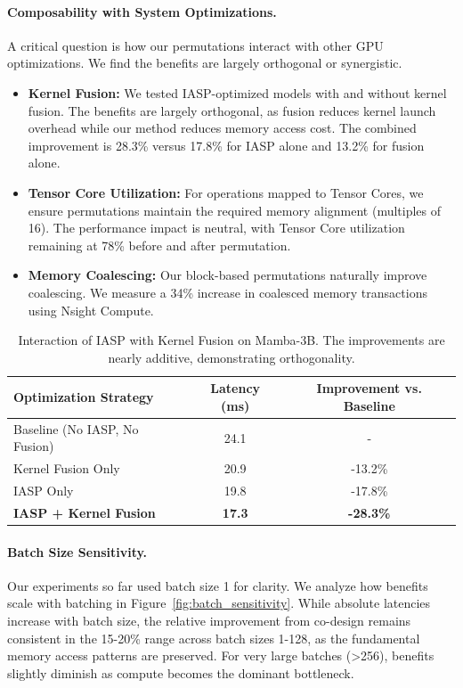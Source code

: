 \documentclass{article}
\begin{document}
\paragraph{Composability with System Optimizations.}
A critical question is how our permutations interact with other GPU optimizations. We find the benefits are largely orthogonal or synergistic.
\begin{itemize}
    \item \textbf{Kernel Fusion:} We tested IASP-optimized models with and without kernel fusion. The benefits are largely orthogonal, as fusion reduces kernel launch overhead while our method reduces memory access cost. The combined improvement is 28.3\% versus 17.8\% for IASP alone and 13.2\% for fusion alone.
    \item \textbf{Tensor Core Utilization:} For operations mapped to Tensor Cores, we ensure permutations maintain the required memory alignment (multiples of 16). The performance impact is neutral, with Tensor Core utilization remaining at 78\% before and after permutation.
    \item \textbf{Memory Coalescing:} Our block-based permutations naturally improve coalescing. We measure a 34\% increase in coalesced memory transactions using Nsight Compute.
\end{itemize}

\begin{table}[hbt!]
\centering
\caption{Interaction of IASP with Kernel Fusion on Mamba-3B. The improvements are nearly additive, demonstrating orthogonality.}
\label{tab:composability}
\begin{tabular}{l c c}
\toprule
\textbf{Optimization Strategy} & \textbf{Latency (ms)} & \textbf{Improvement vs. Baseline} \\
\midrule
Baseline (No IASP, No Fusion) & 24.1 & - \\
Kernel Fusion Only & 20.9 & -13.2\% \\
IASP Only & 19.8 & -17.8\% \\
\textbf{IASP + Kernel Fusion} & \textbf{17.3} & \textbf{-28.3\%} \\
\bottomrule
\end{tabular}
\end{table}

\paragraph{Batch Size Sensitivity.}
Our experiments so far used batch size 1 for clarity. We analyze how benefits scale with batching in Figure~\ref{fig:batch_sensitivity}. While absolute latencies increase with batch size, the relative improvement from co-design remains consistent in the 15-20\% range across batch sizes 1-128, as the fundamental memory access patterns are preserved. For very large batches (>256), benefits slightly diminish as compute becomes the dominant bottleneck.
\end{document}
